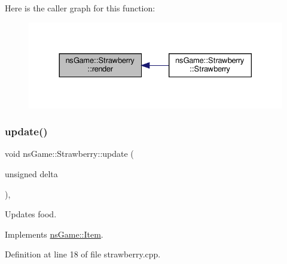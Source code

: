 Here is the caller graph for this function\+:
\nopagebreak
\begin{figure}[H]
\begin{center}
\leavevmode
\includegraphics[width=330pt]{classns_game_1_1_strawberry_a7d4b1b56782cdca38e37a0ea254f7dc5_icgraph}
\end{center}
\end{figure}
\mbox{\label{classns_game_1_1_strawberry_a67f6d787f200bc7202b4ede2bde2b9ac}} 
\subsubsection{\texorpdfstring{update()}{update()}}
{\footnotesize\ttfamily void ns\+Game\+::\+Strawberry\+::update (\begin{DoxyParamCaption}\item[{unsigned}]{delta }\end{DoxyParamCaption})\hspace{0.3cm}{\ttfamily [override]}, {\ttfamily [virtual]}}



Updates food. 



Implements \hyperlink{structns_game_1_1_item_a96c07d0f91eef0d77e91d1a7397091a1}{ns\+Game\+::\+Item}.



Definition at line 18 of file strawberry.\+cpp.

